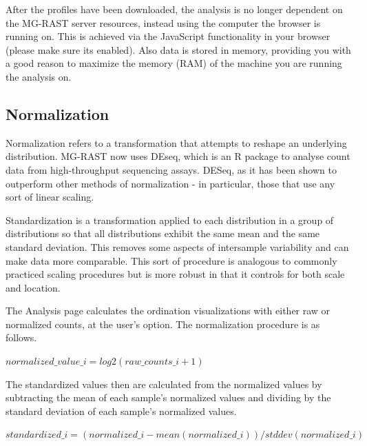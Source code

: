 \documentclass[12pt,fullpage]{report}
\begin{document}
After the profiles have been downloaded, the analysis is no longer dependent on the MG-RAST server resources, instead using the computer the browser is running on. This is achieved via the JavaScript functionality in your browser (please make sure its enabled). Also data is stored in memory, providing you with a good reason to maximize the memory (RAM) of the machine you are running the analysis on.

\subsection*{Normalization}

Normalization refers to a transformation that attempts to reshape an underlying distribution. MG-RAST now uses DEseq, which is an R package to analyse count data from high-throughput sequencing assays. DESeq, as it has been shown to outperform other methods of normalization - in particular, those that use any sort of linear scaling.


Standardization is a transformation applied to each distribution in a group of distributions so that all distributions exhibit the same mean and the same standard deviation. This removes some aspects of intersample variability and can make data more comparable. This sort of procedure is analogous to commonly practiced scaling procedures but is more robust in that it controls for both scale and location.

The Analysis page calculates the ordination visualizations with either raw or normalized counts, at the user's option. The normalization procedure is
as follows.

\begin{small}
\begin{math}
normalized\_value\_i = log2(raw\_counts\_i + 1)
\end{math}
\end{small}

\noindent
The standardized values then are calculated from the normalized values by subtracting the mean of each sample's normalized values and dividing by the standard deviation of each sample's normalized values.

\begin{small}
\begin{math}
standardized\_i = (normalized\_i - mean(normalized\_i)) / stddev(normalized\_i)
\end{math}
\end{small}
\end{document}

